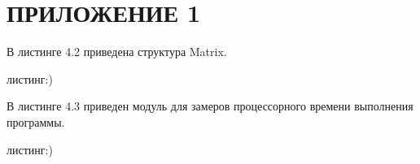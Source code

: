 \chapter*{ПРИЛОЖЕНИЕ 1}

В листинге 4.2 приведена структура Matrix.

листинг:)

В листинге 4.3 приведен модуль для замеров процессорного времени выполнения программы.

листинг:)